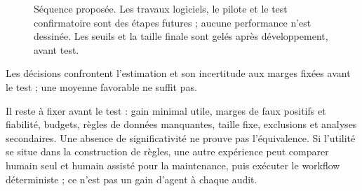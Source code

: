 \documentclass[11pt,a4paper]{article}
\begin{document}
\begin{figure}[H]\centering
{}
\caption{Séquence proposée. Les travaux logiciels, le pilote et le test confirmatoire sont des étapes futures ; aucune performance n'est dessinée. Les seuils et la taille finale sont gelés après développement, avant test.}\label{fig:workplan}
\end{figure}

\begin{samepage}
Les décisions confrontent l'estimation et son incertitude aux marges fixées
avant le test ; une moyenne favorable ne suffit pas.
\par\end{samepage}

Il reste à fixer avant le test : gain minimal utile, marges de faux positifs et
fiabilité, budgets, règles de données manquantes, taille fixe, exclusions et
analyses secondaires. Une absence de significativité ne prouve pas
l'équivalence. Si l'utilité se situe dans la construction de règles, une autre
expérience peut comparer humain seul et humain assisté pour la maintenance,
puis exécuter le workflow déterministe ; ce n'est pas un gain d'agent à chaque audit.
\end{document}
